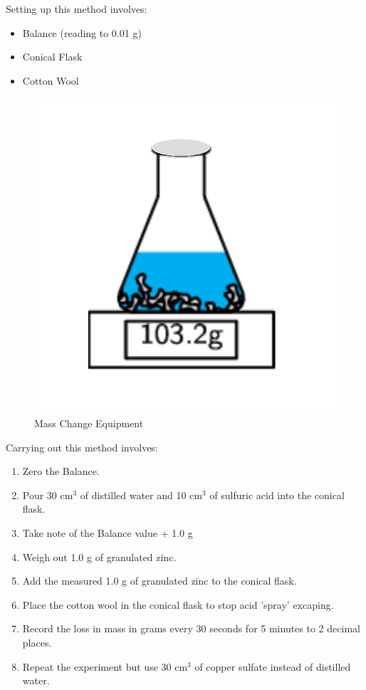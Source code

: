 Setting up this method involves:
\begin{itemize}
\item Balance (reading to 0.01 g)
\item Conical Flask
\item Cotton Wool
\end{itemize}

\begin{figure}[H]
    \includegraphics[width=\textwidth]{./Planning/Images/MassChange.pdf}
    \caption{Mass Change Equipment} \label{fig:Mass Change}
\end{figure}


Carrying out this method involves:

\begin{enumerate}
\item Zero the Balance.
\item Pour 30 cm$^3$ of distilled water and 10 cm$^3$ of sulfuric acid into the conical flask.
\item Take note of the Balance value + 1.0 g
\item Weigh out 1.0 g of granulated zinc.
\item Add the measured 1.0 g of granulated zinc to the conical flask.
\item Place the cotton wool in the conical flask to stop acid 'spray' excaping.
\item Record the loss in mass in grams every 30 seconds for 5 minutes to 2 decimal places.
\item Repeat the experiment but use 30 cm$^3$ of copper sulfate instead of distilled water.
\end{enumerate} 

